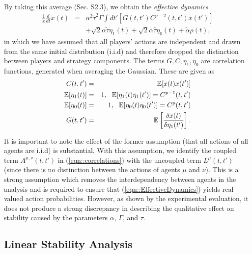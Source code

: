 \documentclass[sigconf,anonymous]{aamas}
\newcommand{\talpha}{\tilde{\alpha}}
\newcommand{\ttau}{\tilde{\tau}}
\newcommand{\htau}{\hat{\tau}}
\begin{document}
By taking this average (Sec. S2.3), we obtain the \textit{effective dynamics}
%
\begin{eqnarray}
    \label{eqn::EffectiveDynamics}
            \frac{1}{x} \frac{d}{dt} x(t) & = & \alpha^2 \ttau^2 \Gamma \int dt' \left [G(t, t')C^{p - 2}(t, t') x(t') \right ] \nonumber \\ && + \sqrt{2} \alpha \ttau \eta_1(t) + \sqrt{2} \alpha \htau \eta_0(t) + \talpha \rho(t), 
\end{eqnarray}
%
in which we have assumed that all players' actions are independent and drawn from the same initial distribution (i.i.d)
and therefore dropped the distinction between players and strategy components. The terms $G, C, \eta_1, \eta_0$ are correlation functions, generated when averaging the Gaussian. These are given as 
%
\begin{eqnarray*}
        C(t, t') & = & \mathbb{E}[x(t) x(t')] \\
        \mathbb{E}[\eta_1(t)] & = & 1, \text{ \space } \mathbb{E}[\eta_1(t) \eta_1(t')]  =  C^{p-1}(t, t') \\
        \mathbb{E}[\eta_0(t)] & = & 1, \text{ \space } \mathbb{E}[\eta_0(t) \eta_0(t')] = C^{p}(t, t') \\
        G(t, t') & = & \mathbb{E}\left [ \frac{\delta x(t)}{ \delta \eta_1(t')} \right].
\end{eqnarray*}

It is important to note the effect of the former assumption (that all
actions of all agents are i.i.d) is substantial. With this assumption,
we identify the coupled term $A^{\mu, \nu} (t, t')$ in
(\ref{eqn::correlations}) with the uncoupled term $L^\mu (t, t')$
(since there is no distinction between the actions of agents $\mu$ and
$\nu$). This is a strong assumption which removes the interdependency
between agents in the analysis and is required to ensure that (\ref{eqn::EffectiveDynamics}) yields real-valued action probabilities. However, as shown by the experimental
evaluation, it does not produce a strong discrepancy in describing the
qualitative effect on stability caused by the parameters $\alpha$, $\Gamma$, and $\tau$.

\subsection{Linear Stability Analysis}
\end{document}
